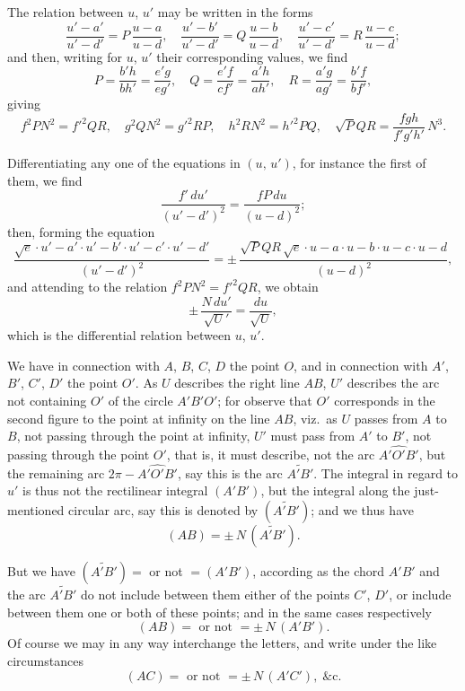 \documentclass[11pt,a4paper]{book}
\begin{document}
\newpage

\noindent
The relation between $u$, $u'$ may be written in the forms
\[
\frac{u'-a'}{u'-d'} = P\,\frac{u-a}{u-d}, \quad \frac{u'-b'}{u'-d'} = Q\,\frac{u-b}{u-d}, \quad \frac{u'-c'}{u'-d'} = R\,\frac{u-c}{u-d};
\]
and then, writing for $u$, $u'$ their corresponding values, we find
\[
P = \frac{b'h}{bh'} = \frac{e'g}{eg'}, \quad Q = \frac{e'f}{cf'} = \frac{a'h}{ah'}, \quad R = \frac{a'g}{ag'} = \frac{b'f}{bf'},
\]
giving
\[
f^2PN^2 = f'^2QR, \quad g^2QN^2 = g'^2RP, \quad h^2RN^2 = h'^2PQ, \quad \surd PQR = \frac{fgh}{f'g'h'}\,N^3.
\]

Differentiating any one of the equations in $(u,\,u')$, for instance the first of them, we find
\[
\frac{f'\,du'}{(u'-d')^2} = \frac{fP\,du}{(u-d)^2};
\]
then, forming the equation
\[
\frac{\surd e \cdot u'-a' \cdot u'-b' \cdot u'-c' \cdot u'-d'}{(u'-d')^2} = \pm\,\frac{\surd PQR\,\surd e \cdot u-a \cdot u-b \cdot u-c \cdot u-d}{(u-d)^2},
\]
and attending to the relation $f^2PN^2 = f'^2QR$, we obtain
\[
\pm\,\frac{N\,du'}{\surd U'} = \frac{du}{\surd U},
\]
which is the differential relation between $u$, $u'$.

We have in connection with $A$, $B$, $C$, $D$ the point $O$, and in connection with $A'$, $B'$, $C'$, $D'$ the point $O'$. As $U$ describes the right line $AB$, $U'$ describes the arc not containing $O'$ of the circle $A'B'O'$; for observe that $O'$ corresponds in the second figure to the point at infinity on the line $AB$, viz.\ as $U$ passes from $A$ to $B$, not passing through the point at infinity, $U'$ must pass from $A'$ to $B'$, not passing through the point $O'$, that is, it must describe, not the arc $\widehat{A'O'B'}$, but the remaining arc $2\pi - \widehat{A'O'B'}$, say this is the arc $\widetilde{A'B'}$. The integral in regard to $u'$ is thus not the rectilinear integral $(A'B')$, but the integral along the just-mentioned circular arc, say this is denoted by $(\widetilde{A'B'})$; and we thus have
\[
(AB) = \pm\,N\,(\widetilde{A'B'}).
\]

But we have $(\widetilde{A'B'}) = $ or not $= (A'B')$, according as the chord $A'B'$ and the arc $\widetilde{A'B'}$ do not include between them either of the points $C'$, $D'$, or include between them one or both of these points; and in the same cases respectively
\[
(AB) = \text{ or not } = \pm\,N\,(A'B').
\]
Of course we may in any way interchange the letters, and write under the like circumstances
\[
(AC) = \text{ or not } = \pm\,N\,(A'C'), \;\&\text{c.}
\]
\end{document}
